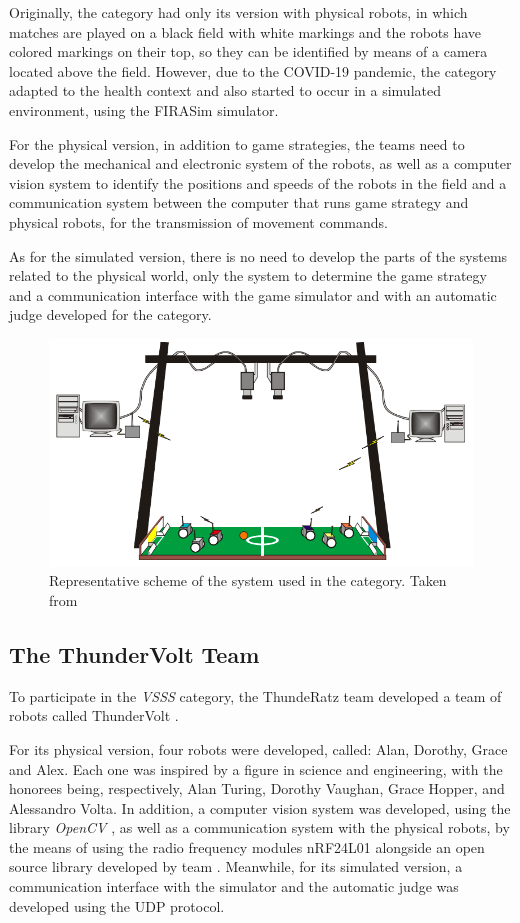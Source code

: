 Originally, the category had only its version with physical robots, in which matches are played on a black field with white markings and the robots have colored markings on their top, so they can be identified by means of a camera located above the field. However, due to the COVID-19 pandemic, the category adapted to the health context and also started to occur in a simulated environment, using the FIRASim \cite{FIRASim} simulator.

For the physical version, in addition to game strategies, the teams need to develop the mechanical and electronic system of the robots, as well as a computer vision system to identify the positions and speeds of the robots in the field and a communication system between the computer that runs game strategy and physical robots, for the transmission of movement commands.

As for the simulated version, there is no need to develop the parts of the systems related to the physical world, only the system to determine the game strategy and a communication interface with the game simulator and with an automatic judge \cite{VSSReferee} developed for the category.

\begin{figure}[!h]
    \centering
    \includegraphics[width=.7\linewidth]{images/General System.png}
    \caption{Representative scheme of the system used in the category. Taken from \cite{FutRobosFerramentaDeEnsino}}
    \label{fig:general_system}
\end{figure}

\subsection{The ThunderVolt Team}

To participate in the \textit{VSSS} category, the ThundeRatz team developed a team of robots called ThunderVolt \cite{ThunderVolt, TDPThunderVolt}.

For its physical version, four robots were developed, called: Alan, Dorothy, Grace and Alex. Each one was inspired by a figure in science and engineering, with the honorees being, respectively, Alan Turing, Dorothy Vaughan, Grace Hopper, and Alessandro Volta. In addition, a computer vision system was developed, using the library \textit{OpenCV} \cite{OpenCV}, as well as a communication system with the physical robots, by the means of using the radio frequency modules nRF24L01 alongside an open source library developed by team \cite{STM3232RF24}. Meanwhile, for its simulated version, a communication interface with the simulator and the automatic judge was developed using the UDP protocol.

